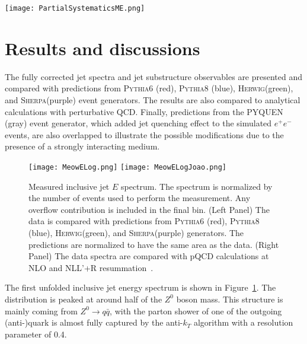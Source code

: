 \documentclass[aps,preprint,superscriptaddress,groupedaddress]{revtex4}  %
\newcommand{\sherpa}{\textsc{Sherpa}\xspace}
\newcommand{\herwig}{\textsc{Herwig}\xspace}
\newcommand{\pythia}[1]{\textsc{Pythia}{#1}\xspace}
\begin{document}
\begin{figure*}
    \centering
    \texttt{[image: PartialSystematicsME.png]}
    \caption{Summary of the size of relative systematic uncertainty from different sources for $M/E$, in bins of jet $E$ from 10--15~GeV (left panel) to above 40~GeV (right panel).}
    \label{Figure:SystematicsJetME}
\end{figure*}

\clearpage

\section{\label{Section:Results}Results and discussions}

The fully corrected jet spectra and jet substructure observables are presented and compared with predictions from \pythia{6} (red), \pythia{8} (blue), \herwig (green), and \sherpa (purple) event generators. The results are also compared to analytical calculations with perturbative QCD. Finally, predictions from the PYQUEN (gray) event generator, which added jet quenching effect to the simulated $e^+e^-$ events, are also overlapped to illustrate the possible modifications due to the presence of a strongly interacting medium.
%
\begin{figure}
    \centering
    \texttt{[image: MeowELog.png]}
    \texttt{[image: MeowELogJoao.png]}
    \caption{Measured inclusive jet $E$ spectrum.  The spectrum is normalized by the number of events used to perform the measurement.  Any overflow contribution is included in the final bin.  (Left Panel) The data is compared with predictions from \pythia{6} (red), \pythia{8} (blue), \herwig (green), and \sherpa (purple) generators.  The predictions are normalized to have the same area as the data. (Right Panel) The data spectra are compared with pQCD calculations at NLO and NLL'+R resummation~\cite{Neill:2021std}.
    }
    \label{Figure:UnfoldedJetE}
\end{figure}
%
The first unfolded inclusive jet energy spectrum is shown in Figure~\ref{Figure:UnfoldedJetE}. The distribution is peaked at around half of the $Z^0$ boson mass. This structure is mainly coming from $Z^0\rightarrow q\bar{q}$, with the parton shower of one of the outgoing (anti-)quark is almost fully captured by the anti-$k_T$ algorithm with a resolution parameter of 0.4. 
\end{document}
